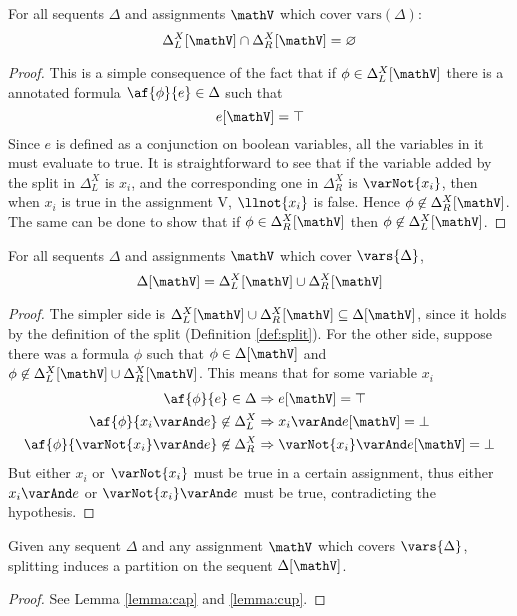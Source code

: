 \begin{lemma}
	\label{lemma:cap}
	For all sequents $\Delta$ and assignments $\mathV$ which cover $\mathrm{vars}(\Delta)$:
	$$ \Delta_L^X[\mathV] \cap \Delta_R^X[\mathV] = \varnothing $$
\end{lemma}
\begin{proof}
	This is a simple consequence of the fact that if $\phi \in \Delta_L^X[\mathV]$ there is a annotated formula $\af{\phi}{e} \in \Delta$ such that 
	$$ e[\mathV] = \top $$
	Since $e$ is defined as a conjunction on boolean variables, all the variables in it must evaluate to true.
	It is straightforward to see that if the variable added by the split in $\Delta_L^X$ is $x_i$, and the corresponding one in $\Delta_R^X$ is $\varNot{x_i}$, then when $x_i$ is true in the assignment V, $\llnot{x_i}$ is false.
	Hence $\phi \not \in \Delta_R^X[\mathV]$.
	The same can be done to show that if $\phi \in \Delta_R^X[\mathV]$ then $\phi \not \in \Delta_L^X[\mathV]$.
\end{proof}
\begin{lemma}
	\label{lemma:cup}
	For all sequents $\Delta$ and assignments $\mathV$ which cover $\vars{\Delta}$,
	$$ \Delta[\mathV] = \Delta_L^X[\mathV] \cup \Delta_R^X[\mathV] $$
\end{lemma}
\begin{proof}
	The simpler side is $\Delta_L^X[\mathV] \cup \Delta_R^X[\mathV] \subseteq \Delta[\mathV]$, since it  holds by the definition of the split (Definition \ref{def:split}).
	For the other side, suppose there was a formula $\phi$ such that $\phi \in \Delta[\mathV]$ and $\phi \not \in \Delta_L^X[\mathV] \cup \Delta_R^X[\mathV]$.
	This means that for some variable $x_i$ 
	\begin{align*}
		\af{\phi}{e} \in \Delta &\Rightarrow e[\mathV] = \top \\
		\af{\phi}{x_i \varAnd e} \not \in \Delta_L^X &\Rightarrow x_i \varAnd e[\mathV] = \bot \\
		\af{\phi}{\varNot{x_i} \varAnd e} \not \in \Delta_R^X &\Rightarrow \varNot{x_i} \varAnd e[\mathV] = \bot
	\end{align*}
	But either $x_i$ or $\varNot{x_i}$ must be true in a certain assignment, thus either $x_i \varAnd e$ or $\varNot{x_i} \varAnd e$ must be true, contradicting the hypothesis.
\end{proof}
\begin{lemma}
	Given any sequent $\Delta$ and any assignment $\mathV$ which covers $\vars{\Delta}$, splitting induces a partition on the sequent $\Delta[\mathV]$.
\end{lemma}
\begin{proof}
	See Lemma \ref{lemma:cap} and \ref{lemma:cup}.
\end{proof}

